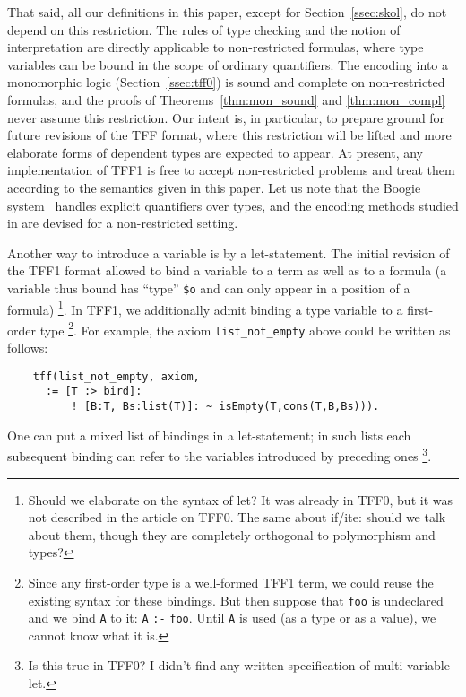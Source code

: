 That said, all our definitions in this paper, except for
Section~\ref{ssec:skol}, do not depend on this restriction.
The rules of type checking and the notion of interpretation
are directly applicable to non-restricted formulas, where
type variables can be bound in the scope of ordinary quantifiers.
The encoding into a monomorphic logic (Section~\ref{ssec:tff0})
is sound and complete on non-restricted formulas, and the proofs of
Theorems~\ref{thm:mon_sound} and \ref{thm:mon_compl} never assume
this restriction.
Our intent is, in particular, to prepare ground for future revisions
of the TFF format, where this restriction will be lifted and more
elaborate forms of dependent types are expected to appear.
At present, any implementation of TFF1 is free to accept
non-restricted problems and treat them according to the semantics
given in this paper.
Let us note that the Boogie
system~\cite{Barnett06boogie} handles explicit quantifiers over types,
and the encoding methods studied in \cite{leino10tacas} are devised
for a non-restricted setting.

Another way to introduce a variable is by a let-statement.
The initial revision of the TFF1 format allowed to bind a variable
to a term as well as to a formula (a variable thus bound has
``type'' \verb+$o+ and can only appear in a position of a formula)%
\footnote{Should we elaborate on the syntax of let?
It was already in TFF0, but it was not described in
the article on TFF0. The same about if/ite: should
we talk about them, though they are completely
orthogonal to polymorphism and types?}.
In TFF1, we additionally admit binding a type variable
to a first-order type%
\footnote{Since any first-order type is a well-formed TFF1 term,
we could reuse the existing syntax for these bindings.
But then suppose that {\tt foo} is undeclared and
we bind {\tt A} to it: {\tt A} {\tt :-} {\tt foo}.
Until {\tt A} is used
(as a type or as a value), we cannot know what it is.}.
For example,
the axiom \verb+list_not_empty+ above could be written as
follows:
\begin{verbatim}
    tff(list_not_empty, axiom,
      := [T :> bird]:
          ! [B:T, Bs:list(T)]: ~ isEmpty(T,cons(T,B,Bs))).
\end{verbatim}
One can put a mixed list of bindings in a let-statement;
in such lists each subsequent binding can refer
to the variables introduced by preceding ones%
\footnote{Is this true in TFF0? I didn't find any written
specification of multi-variable let.}.

